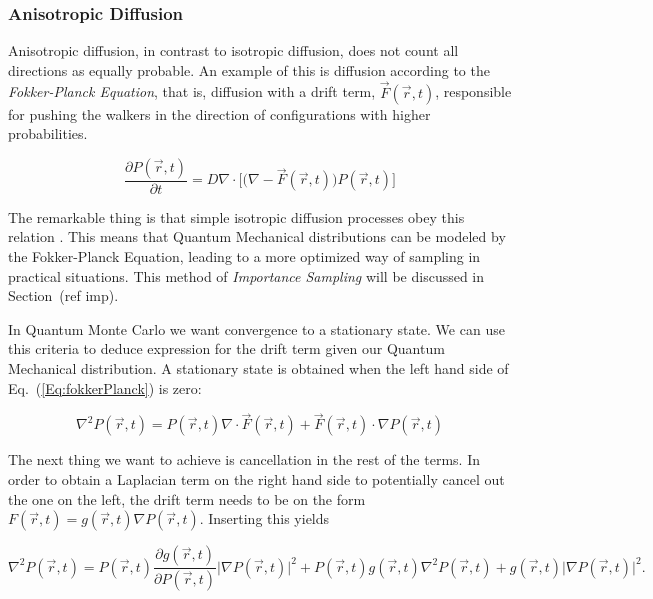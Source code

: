 \subsubsection{Anisotropic Diffusion}

Anisotropic diffusion, in contrast to isotropic diffusion, does not count all directions as equally probable. An example of this is diffusion according to the \textit{Fokker-Planck Equation}, that is, diffusion with a drift term, $\vec F(\vec r, t)$, responsible for pushing the walkers in the direction of configurations with higher probabilities.

\begin{equation}
 \frac{\partial P(\vec r, t)}{\partial t} = D\nabla\cdot\Big[\Big(\nabla - \vec F(\vec r, t)\Big) P(\vec r, t)\Big] 
 \label{Eq:fokkerPlanck}
\end{equation}

The remarkable thing is that simple isotropic diffusion processes obey this relation \cite{abInitioMC}. This means that Quantum Mechanical distributions can be modeled by the Fokker-Planck Equation, leading to a more optimized way of sampling in practical situations. This method of \textit{Importance Sampling} will be discussed in Section~(ref imp). 

In Quantum Monte Carlo we want convergence to a stationary state. We can use this criteria to deduce expression for the drift term given our Quantum Mechanical distribution. A stationary state is obtained when the left hand side of Eq.~(\ref{Eq:fokkerPlanck}) is zero:

\begin{equation*}
 \nabla^2 P(\vec r, t) = P(\vec r, t)\nabla\cdot\vec F(\vec r, t) + \vec F(\vec r, t) \cdot \nabla P(\vec r, t)
\end{equation*}

The next thing we want to achieve is cancellation in the rest of the terms. In order to obtain a Laplacian term on the right hand side to potentially cancel out the one on the left, the drift term needs to be on the form $F(\vec r, t) = g(\vec r, t)\nabla P(\vec r, t)$. Inserting this yields

\begin{equation*}
  \nabla^2 P(\vec r, t) = P(\vec r, t)\frac{\partial g(\vec r, t)}{\partial P(\vec r, t)}\Big|\nabla P(\vec r, t)\Big|^2
  + P(\vec r, t)g(\vec r, t)\nabla^2 P(\vec r, t) + g(\vec r, t) \Big|\nabla P(\vec r, t)\Big|^2.
\end{equation*}

